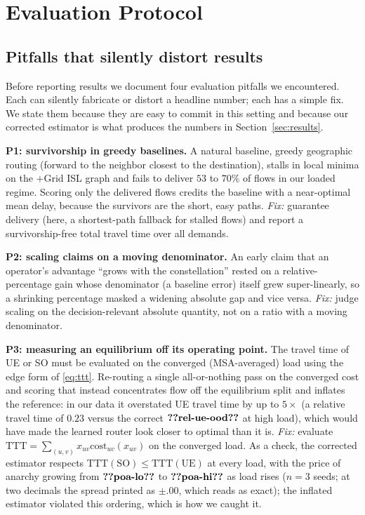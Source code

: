 \documentclass[journal]{IEEEtran}
\newcommand{\cost}{\mathrm{cost}}
\newcommand{\TTT}{\mathrm{TTT}}
\begin{document}
\section{Evaluation Protocol}\label{sec:pitfalls}
\subsection{Pitfalls that silently distort results}
Before reporting results we document four evaluation pitfalls we encountered. Each can
silently fabricate or distort a headline number; each has a simple fix. We state them
because they are easy to commit in this setting and because our corrected estimator is
what produces the numbers in Section~\ref{sec:results}.

\textbf{P1: survivorship in greedy baselines.} A natural baseline, greedy geographic
routing (forward to the neighbor closest to the destination), stalls in local minima on
the $+$Grid ISL graph and fails to deliver $53$ to $70\%$ of flows in our loaded
regime. Scoring only the delivered flows credits the baseline with a near-optimal mean
delay, because the survivors are the short, easy paths. \emph{Fix:} guarantee delivery
(here, a shortest-path fallback for stalled flows) and report a survivorship-free total
travel time over all demands.

\textbf{P2: scaling claims on a moving denominator.} An early claim that an operator's
advantage ``grows with the constellation'' rested on a relative-percentage gain whose
denominator (a baseline error) itself grew super-linearly, so a shrinking percentage
masked a widening absolute gap and vice versa. \emph{Fix:} judge scaling on the
decision-relevant absolute quantity, not on a ratio with a moving denominator.

\textbf{P3: measuring an equilibrium off its operating point.} The travel time of UE or
SO must be evaluated on the converged (MSA-averaged) load using the edge form of
\eqref{eq:ttt}. Re-routing a single all-or-nothing pass on the converged cost and
scoring that instead concentrates flow off the equilibrium split and inflates the
reference: in our data it overstated UE travel time by up to $5\times$ (a relative
travel time of $0.23$ versus the correct $\clm{rel-ue-ood}$ at high load), which would have made the
learned router look closer to optimal than it is. \emph{Fix:} evaluate
$\TTT=\sum_{(u,v)} x_{uv}\cost_{uv}(x_{uv})$ on the converged load. As a check, the
corrected estimator respects $\TTT(\mathrm{SO})\le\TTT(\mathrm{UE})$ at every load, with
the price of anarchy growing from $\clm{poa-lo}$ to $\clm{poa-hi}$ as load rises ($n{=}3$ seeds; at two decimals the spread printed as $\pm.00$, which reads as exact); the inflated estimator
violated this ordering, which is how we caught it.
\end{document}
